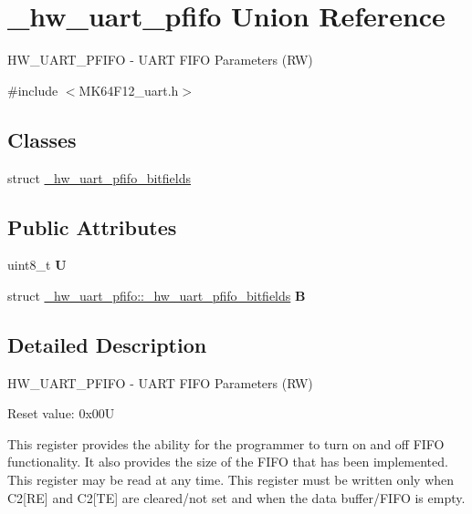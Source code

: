 \hypertarget{union__hw__uart__pfifo}{}\section{\+\_\+hw\+\_\+uart\+\_\+pfifo Union Reference}
\label{union__hw__uart__pfifo}


H\+W\+\_\+\+U\+A\+R\+T\+\_\+\+P\+F\+I\+FO -\/ U\+A\+RT F\+I\+FO Parameters (RW)  




{\ttfamily \#include $<$M\+K64\+F12\+\_\+uart.\+h$>$}

\subsection*{Classes}
\begin{DoxyCompactItemize}
\item 
struct \hyperlink{struct__hw__uart__pfifo_1_1__hw__uart__pfifo__bitfields}{\+\_\+hw\+\_\+uart\+\_\+pfifo\+\_\+bitfields}
\end{DoxyCompactItemize}
\subsection*{Public Attributes}
\begin{DoxyCompactItemize}
\item 
uint8\+\_\+t {\bfseries U}\hypertarget{union__hw__uart__pfifo_a0aeafde9415abbc8b9685df4252f55b1}{}\label{union__hw__uart__pfifo_a0aeafde9415abbc8b9685df4252f55b1}

\item 
struct \hyperlink{struct__hw__uart__pfifo_1_1__hw__uart__pfifo__bitfields}{\+\_\+hw\+\_\+uart\+\_\+pfifo\+::\+\_\+hw\+\_\+uart\+\_\+pfifo\+\_\+bitfields} {\bfseries B}\hypertarget{union__hw__uart__pfifo_af913b3151ad75a64ffa1383d0638dca3}{}\label{union__hw__uart__pfifo_af913b3151ad75a64ffa1383d0638dca3}

\end{DoxyCompactItemize}


\subsection{Detailed Description}
H\+W\+\_\+\+U\+A\+R\+T\+\_\+\+P\+F\+I\+FO -\/ U\+A\+RT F\+I\+FO Parameters (RW) 

Reset value\+: 0x00U

This register provides the ability for the programmer to turn on and off F\+I\+FO functionality. It also provides the size of the F\+I\+FO that has been implemented. This register may be read at any time. This register must be written only when C2\mbox{[}RE\mbox{]} and C2\mbox{[}TE\mbox{]} are cleared/not set and when the data buffer/\+F\+I\+FO is empty. 

